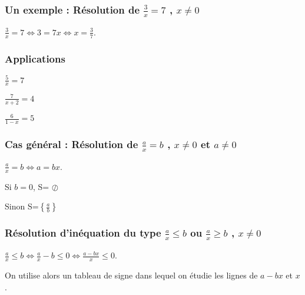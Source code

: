 \subsubsection*{Un exemple : Résolution de $\frac{3}{x}=7$ , $x \neq 0$}

$\frac{3}{x}=7 \Longleftrightarrow 3=7x \Longleftrightarrow  x=\frac{3}{7}$. 

\subsubsection*{Applications}
\begin{list}{•}{}
\item $\frac{5}{x}=7$
\item $\frac{7}{x+2}=4$
\item $\frac{6}{1-x}=5$
\end{list}


\subsubsection*{Cas général : Résolution de $\frac{a}{x}=b$ , $x \neq 0$ et $a \neq 0$ }

$\frac{a}{x}=b \Longleftrightarrow a=bx $. 

\begin{list}{•}{}
\item Si $b =0$, S= $\oslash$
\item Sinon S=$\left\lbrace \frac{a}{b} \right\rbrace $
\end{list}

\subsubsection*{Résolution d'inéquation du type $\frac{a}{x} \leq b$ ou $\frac{a}{x} \geq b$ , $x \neq 0$}

$\frac{a}{x} \leq b \Longleftrightarrow \frac{a}{x} - b \leq 0 \Longleftrightarrow \frac{a-bx}{x} \leq 0  $.

On utilise alors un tableau de signe dans lequel on étudie les lignes de $a-bx$ et $x$.


